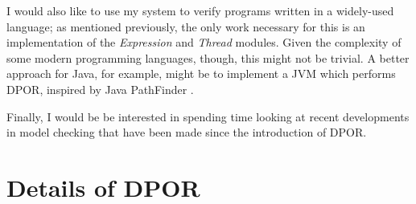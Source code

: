 \documentclass[12pt,a4paper,twoside,openany]{report}
\begin{document}
I would also like
to use my system to verify
programs written in a widely-used
language; as mentioned previously,
the only work necessary for this
is an implementation of the
\textit{Expression} and
\textit{Thread} modules.
Given the complexity of some modern
programming languages, though,
this might not be trivial. A better
approach for Java, for example,
might be to implement a JVM which
performs DPOR, inspired by
Java PathFinder \cite{viss03}.

Finally, I would be
be interested in spending time
looking at recent developments
in model checking
that have been made since
the introduction of DPOR.

\newpage
\null
\thispagestyle{plain}



\appendix

\chapter{Details of DPOR}
\vspace{-0.5cm}
\end{document}
